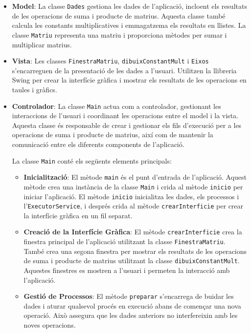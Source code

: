 \documentclass{ieeetj}
\begin{document}
\begin{itemize}
    \item \textbf{Model}: La classe \texttt{Dades} gestiona les dades de l'aplicació, incloent els resultats de les operacions de suma i producte de matrius. Aquesta classe també calcula les constants multiplicatives i emmagatzema els resultats en llistes. La classe \texttt{Matriu} representa una matriu i proporciona mètodes per sumar i multiplicar matrius.
    \item \textbf{Vista}: Les classes \texttt{FinestraMatriu}, \texttt{dibuixConstantMult} i \texttt{Eixos} s'encarreguen de la presentació de les dades a l'usuari. Utilitzen la llibreria Swing per crear la interfície gràfica i mostrar els resultats de les operacions en taules i gràfics.
    \item \textbf{Controlador}: La classe \texttt{Main} actua com a controlador, gestionant les interaccions de l'usuari i coordinant les operacions entre el model i la vista. Aquesta classe és responsable de crear i gestionar els fils d'execució per a les operacions de suma i producte de matrius, així com de mantenir la comunicació entre els diferents components de l'aplicació.

La classe \texttt{Main} conté els següents elements principals:

\begin{itemize}
    \item \textbf{Inicialització}: El mètode \texttt{main} és el punt d'entrada de l'aplicació. Aquest mètode crea una instància de la classe \texttt{Main} i crida al mètode \texttt{inicio} per iniciar l'aplicació. El mètode \texttt{inicio} inicialitza les dades, els processos i l'\texttt{ExecutorService}, i després crida al mètode \texttt{crearInterficie} per crear la interfície gràfica en un fil separat.
    
    \item \textbf{Creació de la Interfície Gràfica}: El mètode \texttt{crearInterficie} crea la finestra principal de l'aplicació utilitzant la classe \texttt{FinestraMatriu}. També crea una segona finestra per mostrar els resultats de les operacions de suma i producte de matrius utilitzant la classe \texttt{dibuixConstantMult}. Aquestes finestres es mostren a l'usuari i permeten la interacció amb l'aplicació.
    
    \item \textbf{Gestió de Processos}: El mètode \texttt{preparar} s'encarrega de buidar les dades i aturar qualsevol procés en execució abans de començar una nova operació. Això assegura que les dades anteriors no interfereixin amb les noves operacions.
    

\end{itemize}
\end{itemize}
\end{document}

